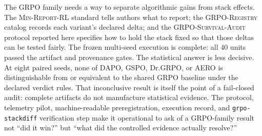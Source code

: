 \documentclass[11pt]{article}
\newcommand{\minreport}{\textsc{Min-Report-RL}}
\newcommand{\grpo}{\textsc{GRPO}}
\newcommand{\audit}{\textsc{GRPO-Survival-Audit}}
\newcommand{\grpoReg}{\textsc{GRPO-Registry}}
\begin{document}
The \grpo{} family needs a way to separate algorithmic gains from stack
effects. The \minreport{} standard tells authors what to report; the
\grpoReg{} catalog records each variant's declared delta; and the \audit{}
protocol reported here specifies how to hold the stack fixed so that those
deltas can be tested fairly. The frozen multi-seed execution is complete: all
40 units passed the artifact and provenance gates. The statistical answer is
less decisive. At eight paired seeds, none of DAPO, GSPO, Dr.\grpo{}, or AERO
is distinguishable from or equivalent to the shared GRPO baseline under the
declared verdict rules. That inconclusive result is itself the point of a
fail-closed audit: complete artifacts do not manufacture statistical evidence.
The protocol, telemetry pilot, machine-readable preregistration, execution
record, and \texttt{grpo-stackdiff} verification step make it operational to
ask of a GRPO-family result not ``did it win?'' but ``what did the controlled
evidence actually resolve?''



\end{document}
